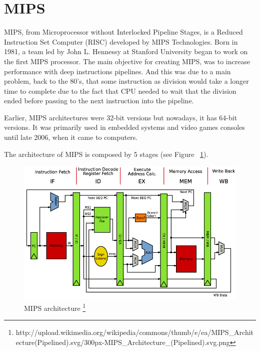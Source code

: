 \documentclass[
  oneside,
  11pt, a4paper,
  footinclude=true,
  headinclude=true,
  cleardoublepage=empty
]{scrbook}
\begin{document}

\section{MIPS}
MIPS, from Microprocessor without Interlocked Pipeline Stages, is a Reduced Instruction Set Computer (RISC) developed by MIPS Technologies. 
Born in 1981, a team led by John L. Hennessy at Stanford University began to work on the first MIPS processor.
The main objective for creating MIPS, was to increase performance with deep instructions pipelines. And this was due to a main problem, back to the 80's, that some instruction as division would take a longer time to complete due to the fact that CPU needed to wait that the division ended before passing to the next instruction into the pipeline.

Earlier, MIPS architectures were 32-bit versions but nowadays, it has 64-bit versions.
It was primarily used in embedded systems and video games consoles until late 2006, when it came to computers.





The architecture of MIPS is composed by 5 stages (see Figure ~\ref{fig:MIPSarchitecture}).

\begin{figure}[h!]
  \centering
    \includegraphics[width=1\textwidth]{img/MIPSarchitecture.png}
    \caption{MIPS architecture \protect\footnote{http://upload.wikimedia.org/wikipedia/commons/thumb/e/ea/MIPS\_Architecture(Pipelined).svg/300px-MIPS\_Architecture\_(Pipelined).svg.png}}
    \label{fig:MIPSarchitecture}
\end{figure}
\end{document}
